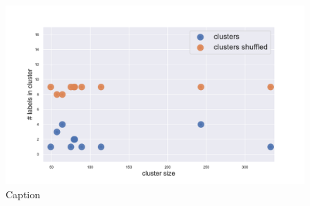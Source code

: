 \begin{figure}
    \centering
    \includegraphics[width=0.9\linewidth]{pictures/topic/gtex/oversigma_10tissue/shuffledcluster_shuffle_label_size_l3_primary_site.pdf}
    \caption{Caption}
    \label{fig:my_label}
\end{figure}


